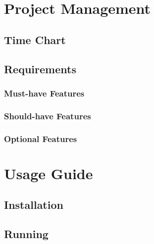 \appendix
\chapter{Project Management}
\section{Time Chart}

\section{Requirements}
\subsection{Must-have Features}
\subsection{Should-have Features}
\subsection{Optional Features}

\chapter{Usage Guide}

\section{Installation}

\section{Running}

